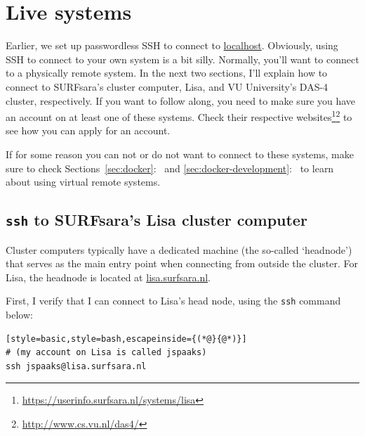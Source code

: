 \documentclass[12pt, a4paper, twoside, openany, titlepage]{book}
\begin{document}
\section{Live systems}
\label{sec:live-systems}

Earlier, we set up passwordless SSH to connect to \url{localhost}. Obviously, using SSH to connect to your own system is a bit silly. Normally, you'll want to connect to a physically remote system. In the next two sections, I'll explain how to connect to SURFsara's cluster computer, Lisa, and VU University's DAS-4 cluster, respectively. If you want to follow along, you need to make sure you have an account on at least one of these systems. Check their respective websites\footnote{\url{https://userinfo.surfsara.nl/systems/lisa}}\footnote{\url{http://www.cs.vu.nl/das4/}} to see how you can apply for an account.

If for some reason you can not or do not want to connect to these systems, make sure to check Sections~\ref{sec:docker}:~\textit{} and \ref{sec:docker-development}:~\textit{} to learn about using virtual remote systems.

\subsection{\texttt{ssh} to SURFsara's Lisa cluster computer}

Cluster computers typically have a dedicated machine (the so-called `headnode') that serves as the main entry point when connecting from outside the cluster. For Lisa, the headnode is located at \url{lisa.surfsara.nl}.

First, I verify that I can connect to Lisa's head node, using the \texttt{ssh} command below:
\begin{lstlisting}[style=basic,style=bash,escapeinside={(*@}{@*)}]
# (my account on Lisa is called jspaaks)
ssh jspaaks@lisa.surfsara.nl
\end{lstlisting}
\end{document}
